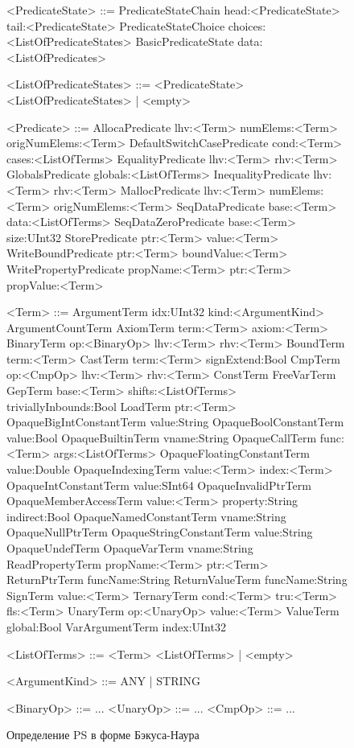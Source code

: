 \begin{figure}
	\begin{grammar}
	\scriptsize
	<PredicateState> ::= PredicateStateChain head:<PredicateState> tail:<PredicateState>
	\alt PredicateStateChoice choices:<ListOfPredicateStates>
	\alt BasicPredicateState data:<ListOfPredicates>

	<ListOfPredicateStates> ::= <PredicateState> <ListOfPredicateStates> | <empty>

	<Predicate> ::= AllocaPredicate lhv:<Term> numElems:<Term> origNumElems:<Term>
	\alt DefaultSwitchCasePredicate cond:<Term> cases:<ListOfTerms>
	\alt EqualityPredicate lhv:<Term> rhv:<Term>
	\alt GlobalsPredicate globals:<ListOfTerms>
	\alt InequalityPredicate lhv:<Term> rhv:<Term>
	\alt MallocPredicate lhv:<Term> numElems:<Term> origNumElems:<Term>
	\alt SeqDataPredicate base:<Term> data:<ListOfTerms>
	\alt SeqDataZeroPredicate base:<Term> size:UInt32
	\alt StorePredicate ptr:<Term> value:<Term>
	\alt WriteBoundPredicate ptr:<Term> boundValue:<Term>
	\alt WritePropertyPredicate propName:<Term> ptr:<Term> propValue:<Term>
	
	\tiny
	<Term> ::= ArgumentTerm idx:UInt32 kind:<ArgumentKind>
	\alt ArgumentCountTerm
	\alt AxiomTerm term:<Term> axiom:<Term>
	\alt BinaryTerm op:<BinaryOp> lhv:<Term> rhv:<Term>
	\alt BoundTerm term:<Term>
	\alt CastTerm term:<Term> signExtend:Bool
	\alt CmpTerm op:<CmpOp> lhv:<Term> rhv:<Term>
	\alt ConstTerm
	\alt FreeVarTerm
	\alt GepTerm base:<Term> shifts:<ListOfTerms> triviallyInbounds:Bool
	\alt LoadTerm ptr:<Term>
	\alt OpaqueBigIntConstantTerm value:String
	\alt OpaqueBoolConstantTerm value:Bool
	\alt OpaqueBuiltinTerm vname:String
	\alt OpaqueCallTerm func:<Term> args:<ListOfTerms>
	\alt OpaqueFloatingConstantTerm value:Double
	\alt OpaqueIndexingTerm value:<Term> index:<Term>
	\alt OpaqueIntConstantTerm value:SInt64
	\alt OpaqueInvalidPtrTerm
	\alt OpaqueMemberAccessTerm value:<Term> property:String indirect:Bool
	\alt OpaqueNamedConstantTerm vname:String
	\alt OpaqueNullPtrTerm 
	\alt OpaqueStringConstantTerm value:String
	\alt OpaqueUndefTerm 
	\alt OpaqueVarTerm vname:String
	\alt ReadPropertyTerm propName:<Term> ptr:<Term>
	\alt ReturnPtrTerm funcName:String
	\alt ReturnValueTerm funcName:String
	\alt SignTerm value:<Term>
	\alt TernaryTerm cond:<Term> tru:<Term> fls:<Term>
	\alt UnaryTerm op:<UnaryOp> value:<Term>
	\alt ValueTerm global:Bool
	\alt VarArgumentTerm index:UInt32

	<ListOfTerms> ::= <Term> <ListOfTerms> | <empty>

	<ArgumentKind> ::= ANY | STRING

	<BinaryOp> ::= ...
	<UnaryOp> ::= ...
	<CmpOp> ::= ...
	\end{grammar}
	
\caption{Определение PS в форме Бэкуса-Наура}
\label{image:predicate-state-definition}
\end{figure}

